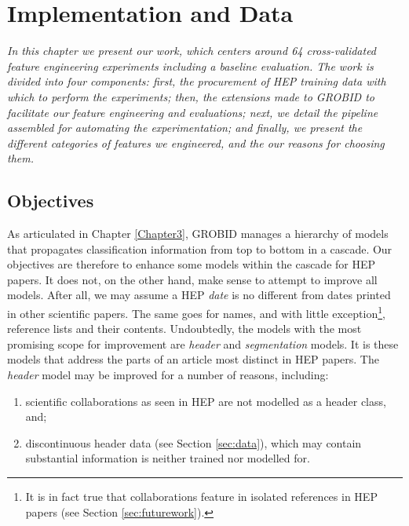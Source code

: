 
\chapter{Implementation and Data} %

\label{Chapter4} %


\emph{In this chapter we present our work, which centers around 64 cross-validated feature engineering experiments including a baseline evaluation. The work is divided into four components: first, the procurement of HEP training data with which to perform the experiments; then, the extensions made to GROBID to facilitate our feature engineering and evaluations; next, we detail the pipeline assembled for automating the experimentation; and finally, we present the different categories of features we engineered, and the our reasons for choosing them.}

\section{Objectives}

As articulated in Chapter \ref{Chapter3}, GROBID manages a hierarchy of models that propagates classification information from top to bottom in a cascade. Our objectives are therefore to enhance some models within the cascade for HEP papers. It does not, on the other hand, make sense to attempt to improve all models. After all, we may assume a HEP \emph{date} is no different from dates printed in other scientific papers. The same goes for names, and with little exception\footnote{It is in fact true that collaborations feature in isolated references in HEP papers (see Section \ref{sec:futurework}).}, reference lists and their contents. Undoubtedly, the models with the most promising scope for improvement are \emph{header} and \emph{segmentation} models. It is these models that address the parts of an article most distinct in HEP papers. The \emph{header} model may be improved for a number of reasons, including:

\begin{enumerate}
\item scientific collaborations as seen in HEP are not modelled as a header class, and;
\item discontinuous header data (see Section \ref{sec:data}), which may contain substantial information is neither trained nor modelled for.
\end{enumerate}

